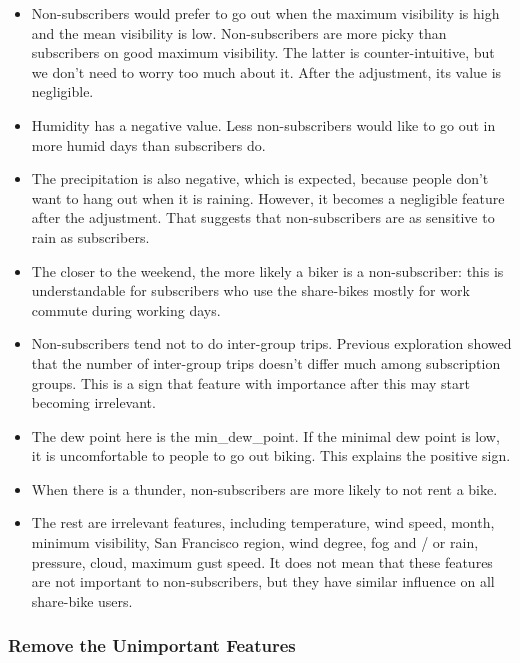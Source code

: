 \documentclass[a4paper]{article}
\begin{document}
\begin{itemize}
				\item Non-subscribers would prefer to go out when the maximum visibility is high and the mean visibility is low. Non-subscribers are more picky than subscribers on good maximum visibility. The latter is counter-intuitive, but we don't need to worry too much about it. After the adjustment, its value is negligible.
				
				\item Humidity has a negative value. Less non-subscribers would like to go out in more humid days than subscribers do. 
				
				\item The precipitation is also negative, which is expected, because people don't want to hang out when it is raining. However, it becomes a negligible feature after the adjustment. That suggests that non-subscribers are as sensitive to rain as subscribers.
				
				\item The closer to the weekend, the more likely a biker is a non-subscriber: this is understandable for subscribers who use the share-bikes mostly for work commute during working days.
				
				\item Non-subscribers tend not to do inter-group trips. Previous exploration showed that the number of inter-group trips doesn't differ much among subscription groups. This is a sign that feature with importance after this may start becoming irrelevant.
				
				\item The dew point here is the min\_dew\_point. If the minimal dew point is low, it is uncomfortable to people to go out biking. This explains the positive sign.
				
				\item When there is a thunder, non-subscribers are more likely to not rent a bike.
				
				\item The rest are irrelevant features, including temperature, wind speed, month, minimum visibility, San Francisco region, wind degree, fog and / or rain, pressure, cloud, maximum gust speed. It does not mean that these features are not important to non-subscribers, but they have similar influence on all share-bike users.
			\end{itemize}
			
			\subsubsection{Remove the Unimportant Features}
\end{document}
